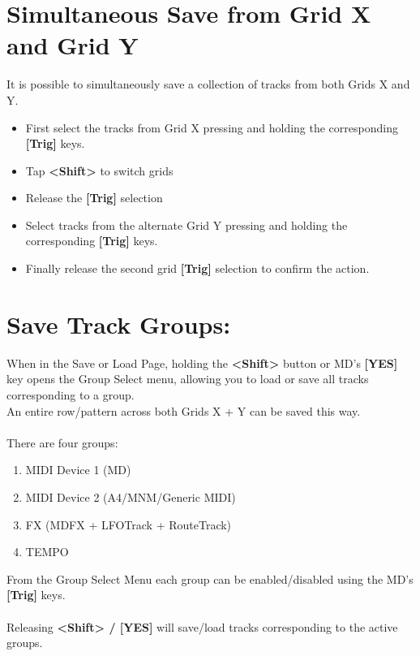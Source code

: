 \section{Simultaneous Save from Grid X and Grid Y}
It is possible to simultaneously save a collection of tracks from both Grids X and Y. 
\begin{itemize}
\item First select the tracks from Grid X pressing and holding the corresponding \textbf{[Trig]} keys.
\item Tap \textbf{<Shift>} to switch grids
\item Release the \textbf{[Trig]} selection
\item Select tracks from the alternate Grid Y pressing and holding the corresponding \textbf{[Trig]} keys. 
\item Finally release the second grid \textbf{[Trig]} selection to confirm the action. 
\end{itemize}

\section{Save Track Groups:}
When in the Save or Load Page, holding the \textbf{<Shift>} button or MD's \textbf{[YES]} key opens the Group Select menu,
allowing you to load or save all tracks corresponding to a group.\\An entire row/pattern across both Grids X + Y can be saved this way.\\
\\
There are four groups:
\begin{enumerate}
    \item MIDI Device 1 (MD)
    \item MIDI Device 2 (A4/MNM/Generic MIDI)
    \item FX (MDFX + LFOTrack + RouteTrack)
    \item TEMPO
\end{enumerate}
From the Group Select Menu each group can be enabled/disabled using the MD's \textbf{[Trig]} keys.\\
\\
Releasing \textbf{<Shift> / [YES]} will save/load tracks corresponding to the active groups.


